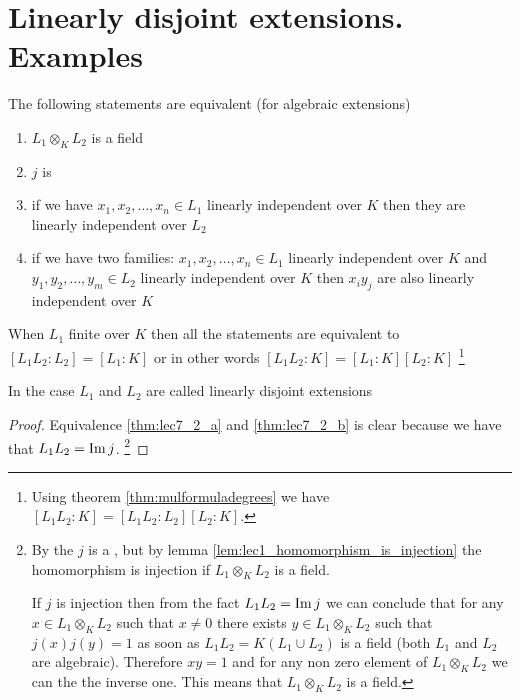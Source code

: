 \section{Linearly disjoint extensions. Examples}

\begin{theorem}
  The following statements are equivalent (for algebraic extensions)
  \begin{enumerate}
  \item $L_1 \otimes_K L_2$ is a field \label{thm:lec7_2_a}
  \item $j$ is  \label{thm:lec7_2_b}
  \item if we have $x_1, x_2, \dots, x_n \in L_1$ linearly independent
    over $K$ then they are linearly independent
    over $L_2$ \label{thm:lec7_2_c}
  \item if we have two families: $x_1, x_2, \dots, x_n \in L_1$ linearly independent
    over $K$ and  $y_1, y_2, \dots, y_m \in L_2$ linearly independent
    over $K$ then $x_i y_j$ are also linearly independent over $K$
    \label{thm:lec7_2_d}
  \end{enumerate}
  When $L_1$ finite over $K$ then all the statements are equivalent to
  $\left[L_1 L_2 : L_2\right] = \left[L_1 : K\right]$ or in other
  words
  $\left[L_1 L_2 : K\right] = \left[L_1 : K\right] \left[L_2 :
    K\right]$
  \footnote{
    Using theorem \ref{thm:mulformuladegrees} we have $\left[L_1 L_2 :
      K\right]  = \left[L_1 L_2 : L_2\right] \left[L_2 : K\right]$.
  }
  
  \begin{definition}
    In the case $L_1$ and $L_2$ are called linearly disjoint extensions
    \label{def:linearlydisjoint}
  \end{definition}
  \begin{proof}
    Equivalence \ref{thm:lec7_2_a} and \ref{thm:lec7_2_b} is clear
    because we have that $L_1 L_2 = \operatorname{Im} j$.
    \footnote{
      By the  $j$ is a 
      , but by lemma
      \ref{lem:lec1_homomorphism_is_injection} the homomorphism is
      injection if $L_1 \otimes_K L_2$ is a field.

      If $j$ is injection then from the fact $L_1 L_2 = \operatorname{Im} j$ we can
      conclude that for any $x \in L_1 \otimes_K L_2$ such that $x \ne
      0$ there exists
      $y \in L_1 \otimes_K L_2$ such that $j(x) j(y) = 1$ as soon as
      $L_1 L_2 = K\left(L_1 \cup L_2\right)$ is a field
      (both $L_1$ and $L_2$ are algebraic). Therefore
      $x y = 1$ and for any non zero element of $L_1 \otimes_K L_2$ we
      can the the inverse one. This means that $L_1 \otimes_K L_2$ is
      a field.
    }


\end{proof}
\end{theorem}
